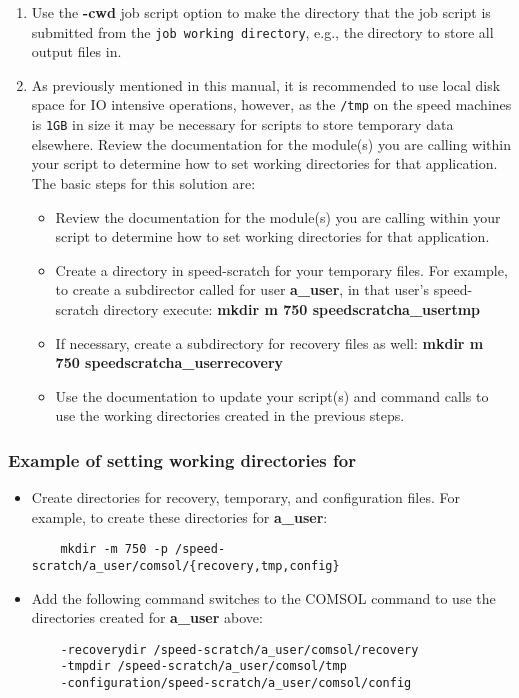 \documentclass{easychair}
\begin{document}
\begin{enumerate}
	\item
Use the \textbf{-cwd} job script option to make the directory that the job script
 is submitted from the \texttt{job working directory}, e.g., the directory to 
 store all output files in.
	\item
As previously mentioned in this manual, it is recommended to use local disk space 
for IO intensive operations, however, as the \texttt{/tmp} on the speed machines 
is \texttt{1GB} in size it may be necessary for scripts to store temporary data 
elsewhere. 
Review the documentation for the module(s) you are calling within your script to 
determine how to set working directories for that application. 
The basic steps for this solution are:
\begin{itemize}
	\item
	Review the documentation for the module(s) you are calling within your script to 
	determine how to set working directories for that application.
	\item
	Create a directory in speed-scratch for your temporary files. 
	For example, to create a subdirector called  for user 
	\textbf{a\_user}, in that user's speed-scratch directory execute:
	\textbf{mkdir \-m 750 \/speed\-scratch\/a\_user\/tmp}
	\item
	If necessary, create a subdirectory for recovery files as well:
	\textbf{mkdir \-m 750 \/speed\-scratch\/a\_user\/recovery}
	\item
	Use the documentation to update your script(s) and command calls to use 
	the working directories created in the previous steps.	
	\end{itemize}
\end{enumerate}

\subsubsection{Example of setting working directories for }

\begin{itemize}
	\item 
	Create directories for recovery, temporary, and configuration files. 
	For example, to create these directories for \textbf{a\_user}:
	\begin{verbatim}
	mkdir -m 750 -p /speed-scratch/a_user/comsol/{recovery,tmp,config}
	\end{verbatim}
	\item
	Add the following command switches to the COMSOL command to use the 
	directories created for \textbf{a\_user} above:
	\begin{verbatim} 
	-recoverydir /speed-scratch/a_user/comsol/recovery 
	-tmpdir /speed-scratch/a_user/comsol/tmp
	-configuration/speed-scratch/a_user/comsol/config
	\end{verbatim}
\end{itemize} 
\end{document}
